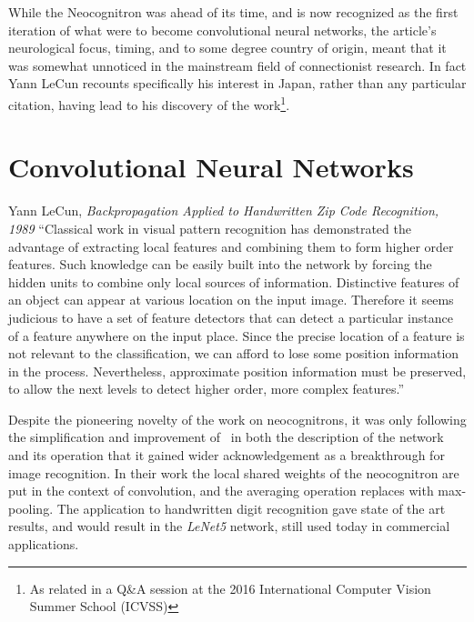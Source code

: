 \documentclass[thesis]{subfiles}
\begin{document}
	While the Neocognitron was ahead of its time, and is now recognized as the first iteration of what were to become convolutional neural networks, the article's neurological focus, timing, and to some degree country of origin, meant that it was somewhat unnoticed in the mainstream field of connectionist research. In fact Yann LeCun recounts specifically his interest in Japan, rather than any particular citation, having lead to his discovery of the work\footnote{As related in a Q\&A session at the 2016 International Computer Vision Summer School (ICVSS)}.
	
	\section{Convolutional Neural Networks}
	\begin{chapquote}{Yann LeCun, \textit{Backpropagation Applied to Handwritten Zip Code Recognition, 1989}}
		``Classical work in visual pattern recognition has demonstrated the advantage of extracting local features and combining them to form higher order features. Such knowledge can be easily built into the network by forcing the hidden units to combine only local sources of information. Distinctive features of an object can appear at various location on the input image. Therefore it seems judicious to have a set of feature detectors that can detect a particular instance of a feature anywhere on the input place. Since the precise location of a feature is not relevant to the classification, we can afford to lose some position information in the process. Nevertheless, approximate position information must be preserved, to allow the next levels to detect higher order, more complex features.''
	\end{chapquote}
	
	Despite the pioneering novelty of the work on neocognitrons, it was only following the simplification and improvement of~\citet{lecun1989backpropagation,Lecun1998} in both the description of the network and its operation that it gained wider acknowledgement as a breakthrough for image recognition. In their work the local shared weights of the neocognitron are put in the context of convolution, and the averaging operation replaces with max-pooling. The application to handwritten digit recognition gave state of the art results, and would result in the \emph{LeNet5} network, still used today in commercial applications.
	
\end{document}
